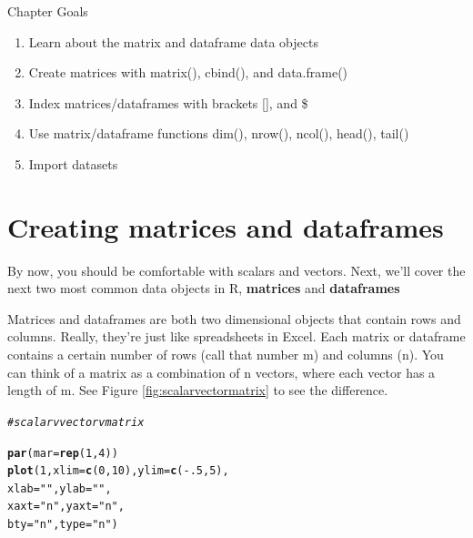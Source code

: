 \documentclass{tufte-book}\usepackage[]{graphicx}\usepackage[]{color}
\makeatletter
\newcommand{\hlnum}[1]{\textcolor[rgb]{0.686,0.059,0.569}{#1}}%
\newcommand{\hlstr}[1]{\textcolor[rgb]{0.192,0.494,0.8}{#1}}%
\newcommand{\hlcom}[1]{\textcolor[rgb]{0.678,0.584,0.686}{\textit{#1}}}%
\newcommand{\hlopt}[1]{\textcolor[rgb]{0,0,0}{#1}}%
\newcommand{\hlstd}[1]{\textcolor[rgb]{0.345,0.345,0.345}{#1}}%
\newcommand{\hlkwc}[1]{\textcolor[rgb]{0.333,0.667,0.333}{#1}}%
\newcommand{\hlkwd}[1]{\textcolor[rgb]{0.737,0.353,0.396}{\textbf{#1}}}%
\newenvironment{kframe}{%
 \def\at@end@of@kframe{}%
 \ifinner\ifhmode%
  \def\at@end@of@kframe{\end{minipage}}%
  \begin{minipage}{\columnwidth}%
 \fi\fi%
 \def\FrameCommand##1{\hskip\@totalleftmargin \hskip-\fboxsep
 \colorbox{shadecolor}{##1}\hskip-\fboxsep
     \hskip-\linewidth \hskip-\@totalleftmargin \hskip\columnwidth}%
 \MakeFramed {\advance\hsize-\width
   \@totalleftmargin\z@ \linewidth\hsize
   \@setminipage}}%
 {\par\unskip\endMakeFramed%
 \at@end@of@kframe}
\newenvironment{knitrout}{}{} %
\makeatother
\begin{document}
\begin{footnotesize}
Chapter Goals


\begin{enumerate}
  \item Learn about the matrix and dataframe data objects
  \item Create matrices with matrix(), cbind(), and data.frame()
  \item Index matrices/dataframes with brackets [], and \$
  \item Use matrix/dataframe functions dim(), nrow(), ncol(), head(), tail()
  \item Import datasets
\end{enumerate}
 

\section{Creating matrices and dataframes}

By now, you should be comfortable with scalars and vectors. Next, we'll cover the next two most common data objects in R, \textbf{matrices} and \textbf{dataframes}

Matrices and dataframes are both two dimensional objects that contain rows and columns. Really, they're just like spreadsheets in Excel. Each matrix or dataframe contains a certain number of rows (call that number m) and columns (n). You can think of a matrix as a combination of n vectors, where each vector has a length of m. See Figure \ref{fig:scalarvectormatrix} to see the difference.


\begin{marginfigure}
\begin{tiny}
\begin{knitrout}
\color{fgcolor}\begin{kframe}
\begin{alltt}
\hlcom{# scalar v vector v matrix}

\hlkwd{par}\hlstd{(}\hlkwc{mar} \hlstd{=} \hlkwd{rep}\hlstd{(}\hlnum{1}\hlstd{,} \hlnum{4}\hlstd{))}
\hlkwd{plot}\hlstd{(}\hlnum{1}\hlstd{,} \hlkwc{xlim} \hlstd{=} \hlkwd{c}\hlstd{(}\hlnum{0}\hlstd{,} \hlnum{10}\hlstd{),} \hlkwc{ylim} \hlstd{=} \hlkwd{c}\hlstd{(}\hlopt{-}\hlnum{.5}\hlstd{,} \hlnum{5}\hlstd{),}
     \hlkwc{xlab} \hlstd{=} \hlstr{""}\hlstd{,} \hlkwc{ylab} \hlstd{=} \hlstr{""}\hlstd{,}
     \hlkwc{xaxt} \hlstd{=} \hlstr{"n"}\hlstd{,} \hlkwc{yaxt} \hlstd{=} \hlstr{"n"}\hlstd{,}
     \hlkwc{bty} \hlstd{=} \hlstr{"n"}\hlstd{,} \hlkwc{type} \hlstd{=} \hlstr{"n"}\hlstd{)}


\end{alltt}
\end{kframe}
\end{knitrout}
\end{tiny}
\end{marginfigure}
\end{footnotesize}
\end{document}
